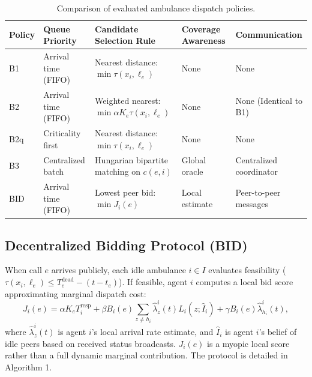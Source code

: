 \documentclass{article}
\begin{document}
\begin{table}[h]
\centering\scriptsize
\setlength{\tabcolsep}{4pt}
\caption{Comparison of evaluated ambulance dispatch policies.}
\label{tab:policy-comparison}
\begin{tabular}{lllll}
\toprule
Policy & Queue Priority & Candidate Selection Rule & Coverage Awareness & Communication \\
\midrule
B1 & Arrival time (FIFO) & Nearest distance: $\min \tau(x_i, \ell_e)$ & None & None \\
B2 & Arrival time (FIFO) & Weighted nearest: $\min \alpha K_e \tau(x_i, \ell_e)$ & None & None (Identical to B1) \\
B2q & Criticality first & Nearest distance: $\min \tau(x_i, \ell_e)$ & None & None \\
B3 & Centralized batch & Hungarian bipartite matching on $c(e, i)$ & Global oracle & Centralized coordinator \\
BID & Arrival time (FIFO) & Lowest peer bid: $\min J_i(e)$ & Local estimate & Peer-to-peer messages \\
\bottomrule
\end{tabular}
\end{table}

\subsection{Decentralized Bidding Protocol (BID)}
When call $e$ arrives publicly, each idle ambulance $i \in I$ evaluates feasibility ($\tau(x_i, \ell_e) \le T_e^{\mathrm{dead}} - (t - t_e)$). If feasible, agent $i$ computes a local bid score approximating marginal dispatch cost:
\begin{equation}
J_i(e) = \alpha K_e T_i^{\mathrm{resp}} + \beta B_i(e)\sum_{z \ne h_i} \widehat{\lambda}_z^i(t) L_i(z; \widehat{I}_i) + \gamma B_i(e)\widehat{\lambda}_{h_i}^i(t), \label{eq:bid-score}
\end{equation}
where $\widehat{\lambda}_z^i(t)$ is agent $i$'s local arrival rate estimate, and $\widehat{I}_i$ is agent $i$'s belief of idle peers based on received status broadcasts. $J_i(e)$ is a myopic local score rather than a full dynamic marginal contribution. The protocol is detailed in Algorithm 1.
\end{document}
